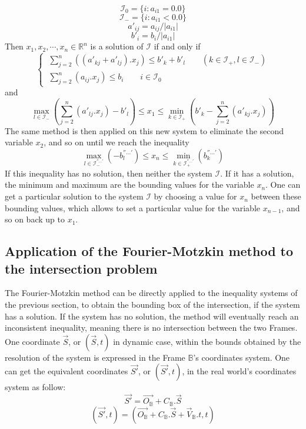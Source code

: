 \documentclass[12pt, a4paper]{article}
\begin{document}
$$\mathcal{I}_0=\{i:a_{i1}=0.0\}$$
$$\mathcal{I}_-=\{i:a_{i1}<0.0\}$$
$$a'_{ij}=a_{ij}/|a_{i1}|$$
$$b'_i=b_i/|a_{i1}|$$
Then $x_1, x_2, \cdots, x_n\in\mathbb{R}^n$ is a solution of $\mathcal{I}$ if and only if
\begin{equation}
\left\{\
\begin{array}{c}
\sum_{j=2}^n((a'_{kj}+a'_{lj}).x_j)\le b'_k+b'_l \qquad (k\in\mathcal{I}_+, l\in\mathcal{I}_-)\\
\sum_{j=2}^n(a_{ij}.x_j)\le b_i \qquad i\in\mathcal{I}_0
\end{array}
\right.
\end{equation}
and
\begin{equation}
\max_{l\in\mathcal{I}_-}(\sum_{j=2}^n(a'_{lj}.x_j)-b'_l)\le x_1\le\min_{k\in\mathcal{I}_+}(b'_k-\sum_{j=2}^n(a'_{kj}.x_j))
\end{equation}
The same method is then applied on this new system to eliminate the second variable $x_2$, and so on until we reach the inequality
\begin{equation}
\max_{l\in\mathcal{I}^{''...'}_-}(-b^{''...'}_l)\le x_n\le\min_{k\in\mathcal{I}^{''...'}_+}(b^{''...'}_k)
\end{equation}
If this inequality has no solution, then neither the system $\mathcal{I}$. If it has a solution, the minimum and maximum are the bounding values for the variable $x_n$. One can get a particular solution to the system $\mathcal{I}$ by choosing a value for $x_n$ between these bounding values, which allows to set a particular value for the variable $x_{n-1}$, and so on back up to $x_1$. 

\subsection{Application of the Fourier-Motzkin method to the intersection problem}

The Fourier-Motzkin method can be directly applied to the inequality systems of the previous section, to obtain the bounding box of the intersection, if the system has a solution. If the system has no solution, the method will eventually reach an inconsistent inequality, meaning there is no intersection between the two Frames.\\

One coordinate $\overrightarrow{S}$, or $(\overrightarrow{S}, t)$ in dynamic case, within the bounds obtained by the resolution of the system is expressed in the Frame $\mathbb{B}$'s coordinates system. One can get the equivalent coordinates $\overrightarrow{S'}$, or $(\overrightarrow{S'}, t)$, in the real world's coordinates system as follow:
\begin{equation}
\overrightarrow{S'}=\overrightarrow{O_\mathbb{B}}+C_\mathbb{B}.\overrightarrow{S}
\end{equation}
\begin{equation}
(\overrightarrow{S'},t)=\left(\overrightarrow{O_\mathbb{B}}+C_\mathbb{B}.\overrightarrow{S}+\overrightarrow{V}_\mathbb{B}.t, t\right)
\end{equation}
\end{document}
